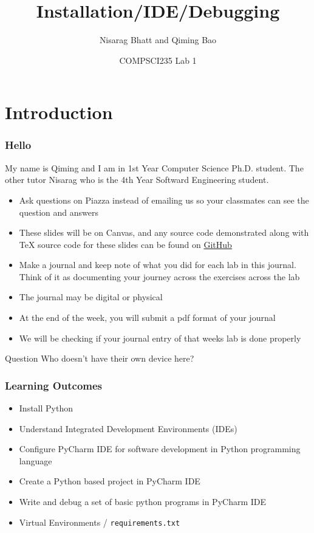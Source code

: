 \documentclass{beamer}
\title[COMPSCI 235 Lab 1 (2020)]
{Installation/IDE/Debugging}
\author{Nisarag Bhatt and Qiming Bao}
\date[August 2020] 
{COMPSCI235 Lab 1}
\begin{document}
\frame{\titlepage}
\section{Introduction}
\begin{frame}
  \frametitle{Hello}
  My name is Qiming and I am in 1st Year Computer Science Ph.D. student. The other tutor Nisarag who is the 4th Year Softward Engineering student.
  \begin{itemize}
    \item Ask questions on Piazza instead of emailing us so your classmates can see the question and answers 
    \item These slides will be on Canvas, and any source code demonstrated along with TeX source code for these slides can be found on \href{https://github.com/FocalChord}{GitHub}
  \end{itemize}
\end{frame}
\begin{frame}
  \begin{itemize}
  	\item Make a journal and keep note of what you did for each lab in this journal. Think of it as documenting your journey across the exercises across the lab
  	\item The journal may be digital or physical
  	\item At the end of the week, you will submit a pdf format of your journal
    \item We will be checking if your journal entry of that weeks lab is done properly 
  \end{itemize}
\end{frame}
\begin{frame}
  \begin{block}{Question}
  	Who doesn't have their own device here?
  \end{block}  
\end{frame}
\begin{frame}
  \frametitle{Learning Outcomes}
  \begin{itemize}
  	\item Install Python
    \item Understand Integrated Development Environments (IDEs)
    \item Configure PyCharm IDE for software development in Python programming language
    \item Create a Python based project in PyCharm IDE
    \item Write and debug a set of basic python programs in PyCharm IDE
    \item Virtual Environments / \texttt{requirements.txt}
  \end{itemize}
\end{frame}
\end{document}
